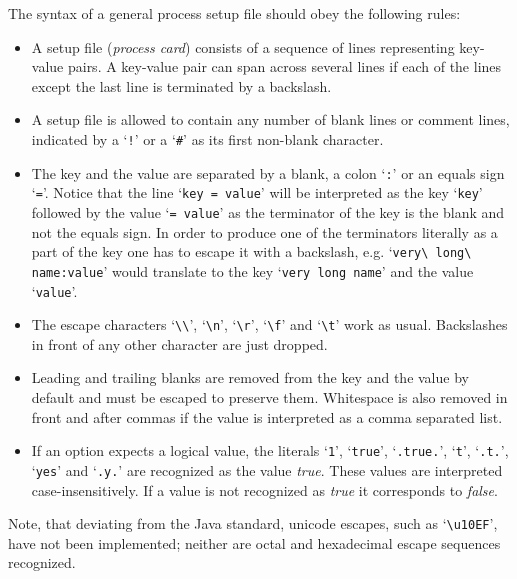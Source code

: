 \documentclass[11pt,a4paper]{refrep}
\begin{document}
The syntax of a general process setup file should obey the following rules:
\begin{itemize}
\item A setup file ({\em process card}) consists of a sequence of lines representing
key-value pairs. A key-value pair can span across several lines
if each of the lines except the last line is terminated by a backslash.
\item A setup file is allowed to contain any number of blank lines or
comment lines, 
indicated by a `\lstinline[basicstyle=\ttfamily]{!}' or a
`\lstinline[basicstyle=\ttfamily]{#}' as its first non-blank character.
\item The key and the value are separated by a blank, a colon
`\lstinline[basicstyle=\ttfamily]{:}' or
an equals sign `\lstinline[basicstyle=\ttfamily]{=}'. Notice that the line
`\lstinline[showspaces=true,basicstyle=\ttfamily]{key = value}'
will be interpreted as the key `\lstinline[basicstyle=\ttfamily]{key}'
followed by the value
`\lstinline[showspaces=true,basicstyle=\ttfamily]{= value}'
as the terminator of the key is the blank and not the equals sign.
In order to produce one of the terminators literally as a part of the
key one has to escape it with a backslash, e.g.
`\lstinline[showspaces=true,basicstyle=\ttfamily]{very\ long\ name:value}'
would translate to the key
`\lstinline[showspaces=true,basicstyle=\ttfamily]{very long name}' and the
value `\lstinline[basicstyle=\ttfamily]{value}'.
\item The escape characters
`\lstinline[basicstyle=\ttfamily]{\\}',
`\lstinline[basicstyle=\ttfamily]{\n}',
`\lstinline[basicstyle=\ttfamily]{\r}',
`\lstinline[basicstyle=\ttfamily]{\f}' and
`\lstinline[basicstyle=\ttfamily]{\t}' work as usual. Backslashes in front
of any other character are just dropped.
\item Leading and trailing blanks are removed from the key and the value
by default and must be escaped to preserve them. Whitespace is also
removed in front and after commas if the value is interpreted as a
comma separated list.
\item If an option expects a logical value, the literals
`\lstinline[basicstyle=\ttfamily]{1}',
`\lstinline[basicstyle=\ttfamily]{true}',
`\lstinline[basicstyle=\ttfamily]{.true.}',
`\lstinline[basicstyle=\ttfamily]{t}',
`\lstinline[basicstyle=\ttfamily]{.t.}',
`\lstinline[basicstyle=\ttfamily]{yes}' and
`\lstinline[basicstyle=\ttfamily]{.y.}'
are recognized as the value \emph{true}. These values are interpreted
case-insensitively. If a value is not recognized as \emph{true} it
corresponds to \emph{false}. 
\end{itemize}
\attention Note, that deviating from the Java standard, unicode
escapes, such as `\lstinline[basicstyle=\ttfamily]{\u10EF}', have not
been implemented; neither are octal and hexadecimal escape sequences
recognized.
\end{document}
